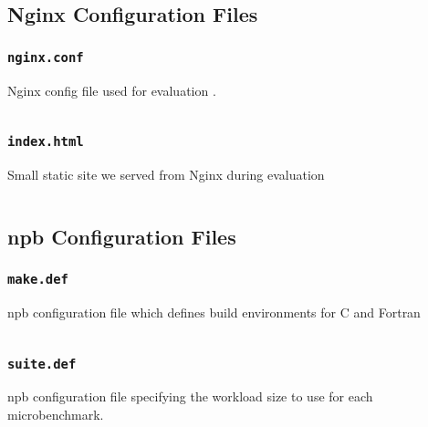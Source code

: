 \subsection{Nginx Configuration Files}\label{subsec:nginx}

\subsubsection{\texttt{nginx.conf}}
\begin{listing}[H]
  \caption{Nginx config file used for evaluation \af.}
    \label{lst:nginx-conf}
    \inputminted[fontsize=\small, frame=single,
    linenos]{python}{./listings/nginx/nginx_bench/nginx.conf}
\end{listing}

\subsubsection{\texttt{index.html}}
\begin{listing}[H]
  \caption{Small static site we served from Nginx during evaluation}
    \label{lst:index-html}
    \inputminted[fontsize=\small, frame=single,
    linenos]{html}{./listings/nginx/nginx_bench/html/index.html}
\end{listing}

\subsection{\acs{npb} Configuration Files}\label{subsec:npb}

\subsubsection{\texttt{make.def}}
\begin{listing}[H]
  \caption{\ac{npb} configuration file which defines build environments for C
  and Fortran}
    \label{lst:npb-make-def}
    \inputminted[fontsize=\small, frame=single,
    linenos]{make}{./listings/nbp/make.def}
\end{listing}

\subsubsection{\texttt{suite.def}}
\begin{listing}[H]
  \caption{\ac{npb} configuration file specifying the workload size to use for
  each microbenchmark.}
    \label{lst:npb-suite-def}
    \inputminted[fontsize=\small, frame=single,
    linenos]{text}{./listings/nbp/suite.def}
\end{listing}


